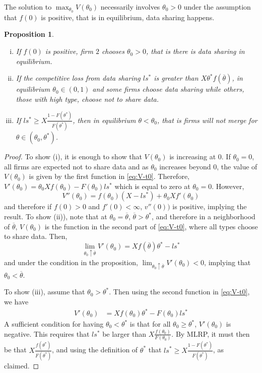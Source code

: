 \documentclass[a4paper]{article}
\newtheorem{prop}{Proposition}
\renewcommand{\t}{\theta}
\begin{document}
%
The solution to $\max_{\t_0} V(\t_0)$ necessarily involves $\t_0>0$ under the assumption that $f(0)$ is positive, that is in equilibrium, data sharing happens.
\begin{prop}
  \begin{enumerate}[(i)]\setlength\itemsep{0em}
    \item If $f(0)$ is positive, firm $2$ chooses $\t_0>0$, that is there is data sharing in equilibrium. 
    \item If the competitive loss from data sharing $l s^*$ is greater than $X\t^* f(\overline \t)$, in equilibrium $\t_0\in (0,1)$ and some firms choose data sharing while others, those with high type, choose not to share data.
    \item If $ls^*\geq X\frac{1-F(\t^*)}{F(\t^*)}$, then in equilibrium $\t<\t_0$, that is firms will not merge for $\t\in (\t_0,\t^*)$.
  \end{enumerate}
\end{prop}
\begin{proof}
  To show (i), it is enough to show that $V(\t_0)$ is increasing at $0$. If $\t_0=0$, all firms are expected not to share data and as $\theta_0$ increases beyond $0$, the value of $V(\t_0)$ is given by the first function in \eqref{eq:V-t0}. Therefore, $ V'(\t_0)
=\t_0 X f(\t_0)-F(\t_0) ls^*$ which is equal to zero at $\t_0=0$. However,
\[
V''(\t_0)=f(\t_0)(X-ls^*)+\t_0 X f'(\t_0)
\]
 and therefore if $f(0)>0$ and $f'(0)<\infty$,  $v''(0))$ is positive, implying the result. 
  To show (ii)), note that at $\t_0=\overline \t$, $\overline \t>\t^*$, and therefore in a neighborhood of $\overline \t$, $V(\t_0)$ is the function in the second part of \eqref{eq:V-t0}, where all types choose to share data. Then, 
  \[
    \lim_{\t_0\uparrow \overline \t}V'(\t_0)=Xf(\overline \t)\t^*- ls^*
 \]
and under the condition in the proposition, $\lim_{\t_0\uparrow \overline \t}V'(\t_0)<0$, implying that $\t_0<\overline \t$.

To show (iii), assume that $\t_0>\t^*$. Then using the second function in \eqref{eq:V-t0}, we have
\begin{align*}
  V'(\t_0)&=Xf(\t_0)\t^*-F(\t_0)l s^*
\end{align*}
A sufficient condition for having $\t_0<\t^*$ is that for all $\t_0\geq \t^*$, $V'(\t_0)$ is negative. This requires that $ls^*$ be larger than $X\frac{f(\t_0)}{F(\t_0)}$. By MLRP, it must then be that  $X\frac{f(\t^*)}{F(\t^*)}$, and using the definition of $\t^*$ that $ls^*\geq X\frac{1-F(\t^*)}{F(\t^*)}$, as claimed.
\end{proof}
\end{document}
